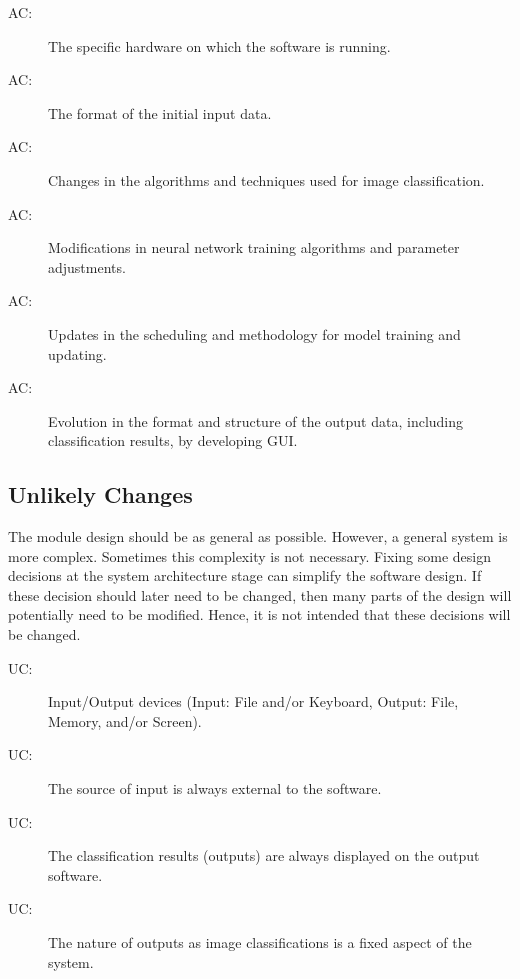 \documentclass[12pt, titlepage]{article}
\newcounter{acnum}
\newcommand{\actheacnum}{AC\theacnum}
\newcounter{ucnum}
\newcommand{\uctheucnum}{UC\theucnum}
\begin{document}
\begin{description}
\item[ \actheacnum \label{acHardware}:] The specific
  hardware on which the software is running.
\item[ \actheacnum \label{acInput}:] The format of the
  initial input data.
\item[ \actheacnum \label{algo}:] Changes in the 
  algorithms and techniques used for image classification.
\item[ \actheacnum \label{ANNAlgo}:] Modifications in 
  neural network training algorithms and parameter adjustments.
\item[ \actheacnum \label{modelTraining}:] Updates in the 
  scheduling and methodology for model training and updating.
\item[ \actheacnum \label{acOutput}:] Evolution in the 
  format and structure of the output data, including classification results, 
  by developing GUI.
\end{description}

\subsection{Unlikely Changes} \label{SecUchange}

The module design should be as general as possible. However, a general system is
more complex. Sometimes this complexity is not necessary. Fixing some design
decisions at the system architecture stage can simplify the software design. If
these decision should later need to be changed, then many parts of the design
will potentially need to be modified. Hence, it is not intended that these
decisions will be changed.

\begin{description}
\item[ \uctheucnum \label{ucIO}:] Input/Output devices
  (Input: File and/or Keyboard, Output: File, Memory, and/or Screen).
\item[ \uctheucnum \label{ucIO}:] The source of input 
  is always external to the software.
\item[ \uctheucnum \label{ucIO}:] The classification results
 (outputs) are always displayed on the output software.
\item[ \uctheucnum \label{ucIO}:] The nature of outputs as 
image classifications is a fixed aspect of the system.
\end{description}
\end{document}
